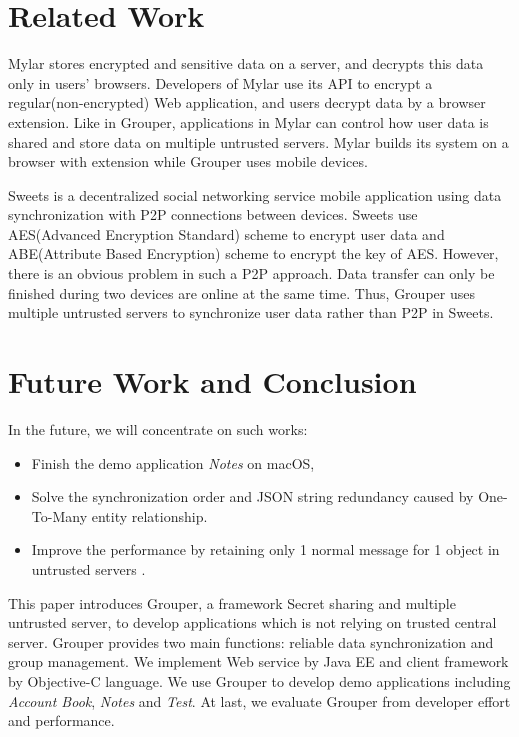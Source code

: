 \documentclass[twocolumn,10pt]{article}
\begin{document}
\section{Related Work}

Mylar\cite{popa2014building} stores encrypted and sensitive data on a server, and decrypts this data only in users’ browsers. Developers of Mylar use its API to encrypt a regular(non-encrypted) Web application, and users decrypt data by a browser extension. Like in Grouper, applications in Mylar can control how user data is shared and store data on multiple untrusted servers. Mylar builds its system on a browser with extension while Grouper uses mobile devices.

Sweets\cite{sweets} is a decentralized social networking service mobile application using data synchronization with P2P connections between devices. Sweets use AES(Advanced Encryption Standard) scheme to encrypt user data and ABE(Attribute Based Encryption) scheme to encrypt the key of AES. However, there is an obvious problem in such a P2P approach. Data transfer can only be finished during two devices are online at the same time. Thus, Grouper uses multiple untrusted servers to synchronize user data rather than P2P in Sweets.

\section{Future Work and Conclusion}

In the future, we will concentrate on such works:
\begin{itemize}
	\setlength{\itemsep}{1pt}
	\setlength{\parskip}{0pt}
	\setlength{\parsep}{0pt}
	\item Finish the demo application \emph{Notes} on macOS,
	\item Solve the synchronization order and JSON string redundancy caused by One-To-Many entity relationship.
	\item Improve the performance by retaining only 1 normal message for 1 object in untrusted servers .
\end{itemize}

This paper introduces Grouper, a framework Secret sharing and multiple untrusted server, to develop applications which is not relying on trusted central server. Grouper provides two main functions: reliable data synchronization and group management. We implement Web service by Java EE and client framework by Objective-C language. We use Grouper to develop demo applications including \emph{Account Book}, \emph{Notes} and \emph{Test}. At last, we evaluate Grouper from developer effort and performance.


{
	\footnotesize
	
}
\end{document}
